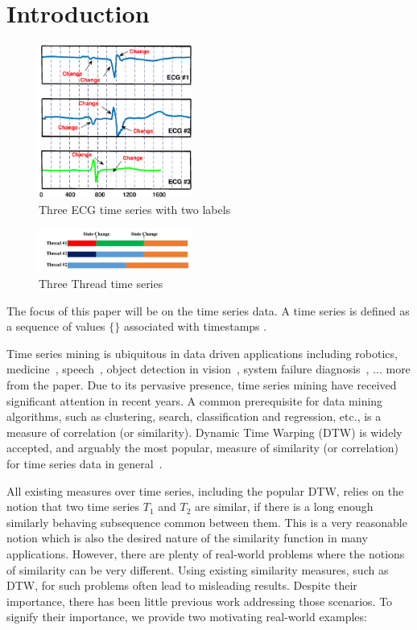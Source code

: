 \section{Introduction}
\label{sec:introduction}


\begin{figure}[t]
\centering
\includegraphics[width=0.45\textwidth]{ECGexp.eps}
\caption{ Three ECG time series with two labels }
\label{fig:ecgexample}
\end{figure}

\begin{figure}[t]
\centering
\includegraphics[width=0.45\textwidth]{HPCExample.pdf}
\caption{Three Thread time series}
\label{fig:hpcexample}
\end{figure}

The focus of this paper will be on the time series data. A time series is defined as a sequence of values $\{\}$ associated with timestamps $ $.

Time series mining is ubiquitous in data driven applications including robotics, medicine~\cite{}, speech~\cite{rabiner1993fundamentals}, object detection in vision~\cite{yang2002detecting, sonka2014image}, system failure diagnosis~\cite{luo2014correlating,sun2014querying}, ... more from the paper.  Due to its pervasive presence, time series mining have received significant attention in recent years. A common prerequisite for data mining algorithms, such as clustering, search, classification and regression, etc., is a measure of correlation (or similarity). Dynamic Time Warping (DTW) is widely accepted, and arguably the most popular, measure of similarity (or correlation) for time series data in general~\cite{}.

All existing measures over time series, including the popular DTW, relies on the notion that two time series $T_1$ and $T_2$ are similar, if there is a long enough similarly behaving subsequence common between them. This is a very reasonable notion which is also the desired nature of the similarity function in many applications.  However, there are plenty of real-world problems where the notions of similarity can be very different. Using existing similarity measures, such as DTW, for such problems often lead to misleading results. Despite their importance, there has been little previous work addressing those scenarios. To signify their importance, we provide two motivating real-world examples:



